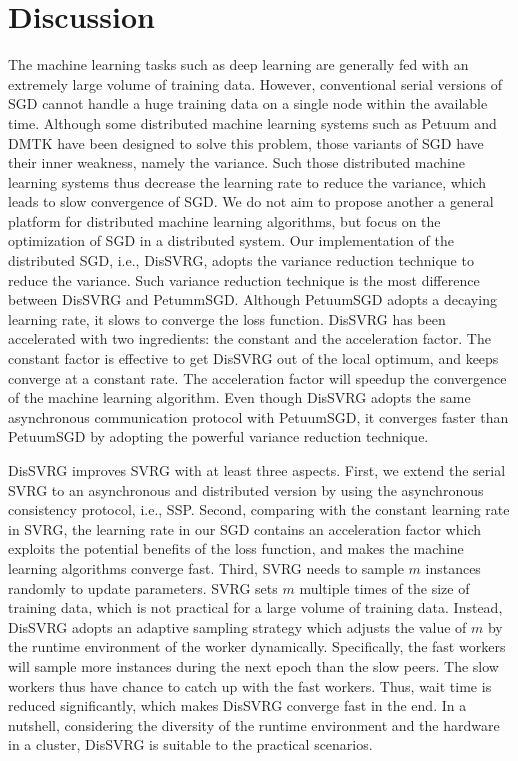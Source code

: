 \documentclass[preprint,review,11pt,a4paper]{elsarticle}
\begin{document}
\section{Discussion}
\label{discussion}
The machine learning tasks such as deep learning are generally fed with an extremely large volume of training data. However, conventional serial versions of SGD  cannot handle a huge training data on a single node within the available time. Although some distributed machine learning systems such as Petuum \cite{Xing:2015ib} and DMTK\cite{Yuan:2015ka} have been designed to solve this problem, those variants of SGD have their inner weakness, namely the variance. Such those distributed machine learning systems thus decrease the learning rate to reduce the variance, which leads to slow convergence of SGD. We do not aim to propose another a general platform for distributed machine learning algorithms, but focus on the optimization of SGD in a distributed system. Our implementation of the distributed SGD, i.e., DisSVRG, adopts the variance reduction technique to reduce the variance. Such variance reduction technique is the most difference between DisSVRG and PetummSGD. Although PetuumSGD  adopts a decaying learning rate, it slows to converge the loss function. DisSVRG has been accelerated with two ingredients: the constant and the acceleration factor. The constant factor is effective to get DisSVRG out of the local optimum, and keeps converge at a constant rate. The acceleration factor will speedup the convergence of the machine learning algorithm. Even though DisSVRG adopts the same asynchronous communication protocol with PetuumSGD, it converges faster than PetuumSGD by adopting the powerful variance reduction technique.

DisSVRG improves SVRG with at least three aspects. First, we extend the serial SVRG to an asynchronous and distributed version by using the asynchronous consistency protocol, i.e., SSP. Second, comparing with the constant learning rate in SVRG, the learning rate in our SGD contains an acceleration factor which exploits the potential benefits of the loss function, and makes the machine learning algorithms converge fast. Third, SVRG needs to sample $m$ instances randomly to update parameters. SVRG sets $m$ multiple times of the size of training data, which is not practical for a large volume of training data. Instead, DisSVRG adopts an adaptive sampling strategy which adjusts the value of $m$ by the runtime environment of the worker dynamically. Specifically, the fast workers will sample more instances during the next epoch than the slow peers. The slow workers thus have chance to catch up with the fast workers. Thus, wait time is reduced significantly, which makes DisSVRG converge fast in the end. In a nutshell, considering the diversity of the runtime environment and the hardware in a cluster, DisSVRG is suitable to the practical scenarios.
\end{document}
